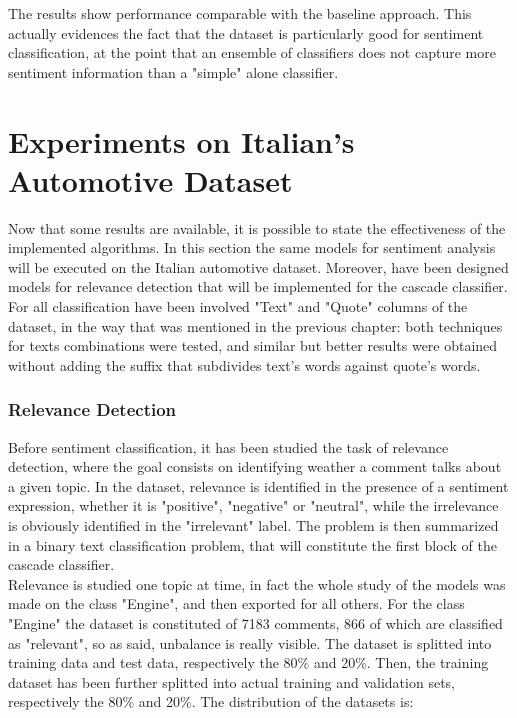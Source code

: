 The results show performance comparable with the baseline approach. This actually evidences the fact that the dataset is particularly good for sentiment classification, at the point that an ensemble of classifiers does not capture more sentiment information than a "simple" alone classifier.






\section{Experiments on Italian's Automotive Dataset}

Now that some results are available, it is possible to state the effectiveness of the implemented algorithms. In this section the same models for sentiment analysis will be executed on the Italian automotive dataset. Moreover, have been designed models for relevance detection that will be implemented for the cascade classifier. For all classification have been involved "Text" and "Quote" columns of the dataset, in the way that was mentioned in the previous chapter: both techniques for texts combinations were tested, and similar but better results were obtained without adding the suffix that subdivides text's words against quote's words. \\

\subsubsection{Relevance Detection}

Before sentiment classification, it has been studied the task of relevance detection, where the goal consists on identifying weather a comment talks about a given topic. In the dataset, relevance is identified in the presence of a sentiment expression, whether it is "positive", "negative" or "neutral", while the irrelevance is obviously identified in the "irrelevant" label. The problem is then summarized in a binary text classification problem, that will constitute the first block of the cascade classifier.\\
Relevance is studied one topic at time, in fact the whole study of the models was made on the class "Engine", and then exported for all others. For the class "Engine" the dataset is constituted of 7183 comments, 866 of which are classified as "relevant", so as said, unbalance is really visible. The dataset is splitted into training data and test data, respectively the 80\% and 20\%. Then, the training dataset has been further splitted into actual training and validation sets, respectively the 80\% and 20\%. The distribution of the datasets is:

